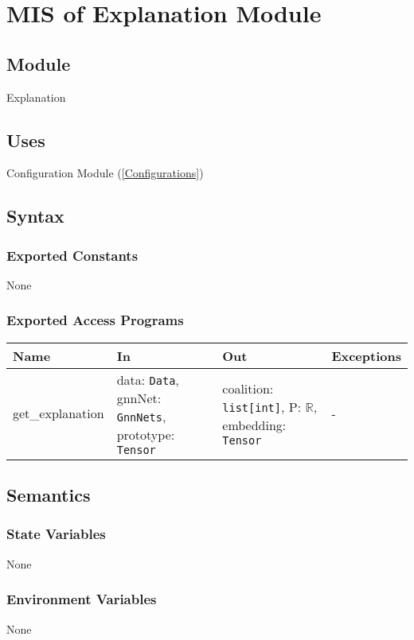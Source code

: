 \documentclass[12pt, titlepage]{article}
\begin{document}
\section{MIS of Explanation Module} \label{Explanation}

\subsection{Module}
Explanation

\subsection{Uses}
Configuration Module (\ref{Configurations})

\subsection{Syntax}

\subsubsection{Exported Constants}
None

\subsubsection{Exported Access Programs}

\begin{center}
\begin{tabular}{p{3cm} p{5cm} p{4.5cm} p{3cm}}
\hline
\textbf{Name} & \textbf{In} & \textbf{Out} & \textbf{Exceptions} \\
\hline
get\_explanation & data: \texttt{Data}, gnnNet: \texttt{GnnNets}, prototype: \texttt{Tensor} & coalition: \texttt{list[int]}, P: \(\mathbb{R}\), embedding: \texttt{Tensor} & - \\
\hline
\end{tabular}
\end{center}

\subsection{Semantics}

\subsubsection{State Variables}
None

\subsubsection{Environment Variables}
None
\end{document}
